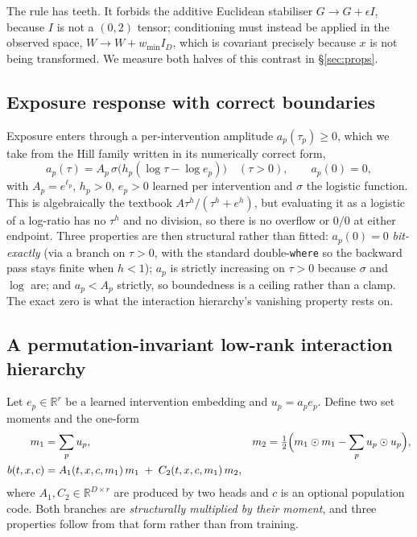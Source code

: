 \documentclass{article}
\begin{document}
The rule has teeth. It forbids the additive Euclidean stabiliser $G \to G + \epsilon I$,
because $I$ is not a $(0,2)$ tensor; conditioning must instead be applied in the observed
space, $W \to W + w_{\min} I_{D}$, which is covariant precisely because $x$ is not being
transformed. We measure both halves of this contrast in \S\ref{sec:props}.

\subsection{Exposure response with correct boundaries}
\label{sec:dose}

Exposure enters through a per-intervention amplitude $a_{p}(\tau_{p}) \ge 0$, which we take
from the Hill family written in its numerically correct form,
\begin{equation}
a_{p}(\tau) = A_{p}\,\sigma\bigl(h_{p}(\log \tau - \log e_{p})\bigr) \quad (\tau > 0),
\qquad a_{p}(0) = 0 ,
\label{eq:hill}
\end{equation}
with $A_{p} = e^{\ell_{p}}$, $h_{p} > 0$, $e_{p} > 0$ learned per intervention and $\sigma$
the logistic function. This is algebraically the textbook
$A\tau^{h}/(\tau^{h} + e^{h})$, but evaluating it as a logistic of a log-ratio has no
$\tau^{h}$ and no division, so there is no overflow or $0/0$ at either endpoint. Three
properties are then structural rather than fitted: $a_{p}(0) = 0$ \emph{bit-exactly} (via a
branch on $\tau > 0$, with the standard double-\texttt{where} so the backward pass stays
finite when $h < 1$); $a_{p}$ is strictly increasing on $\tau > 0$ because $\sigma$ and
$\log$ are; and $a_{p} < A_{p}$ strictly, so boundedness is a ceiling rather than a clamp.
The exact zero is what the interaction hierarchy's vanishing property rests on.

\subsection{A permutation-invariant low-rank interaction hierarchy}
\label{sec:hier}

Let $e_{p} \in \mathbb{R}^{r}$ be a learned intervention embedding and $u_{p} = a_{p}e_{p}$.
Define two set moments and the one-form
\begin{align}
m_{1} &= \sum_{p} u_{p}, &
m_{2} &= \tfrac{1}{2}\Bigl( m_{1} \odot m_{1} - \sum_{p} u_{p} \odot u_{p} \Bigr), \\
b(t, x, c) &= A_{1}(t, x, c, m_{1})\, m_{1} \;+\; C_{2}(t, x, c, m_{1})\, m_{2},
\label{eq:hierarchy}
\end{align}
where $A_{1}, C_{2} \in \mathbb{R}^{D \times r}$ are produced by two heads and $c$ is an
optional population code. Both branches are \emph{structurally multiplied by their moment},
and three properties follow from that form rather than from training.
\end{document}
